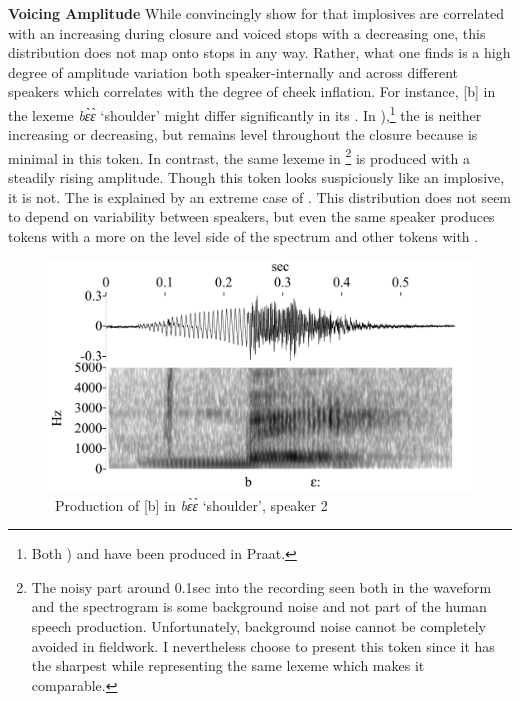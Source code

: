 \documentclass[output=paper]{LSP/langsci}
\begin{document}
{\bf Voicing Amplitude} While \citet{Nagano2012} convincingly show for  that implosives are correlated with an increasing  during closure and voiced stops with a decreasing one, this distribution does not map onto  stops in any way. Rather, what one finds is a high degree of amplitude variation both speaker-internally and across different speakers which correlates with the degree of cheek inflation.  For instance, [b] in the lexeme {\it bɛ̀ɛ̀} `shoulder' might differ significantly in its . In ),\footnote{Both ) and  have been produced in Praat.} the  is neither increasing or decreasing, but remains level throughout the closure because  is minimal in this token. In contrast, the same lexeme in \footnote{The noisy part around 0.1sec into the recording seen both in the waveform and the spectrogram is some background noise and not part of the human speech production. Unfortunately, background noise cannot be completely avoided in fieldwork. I nevertheless choose to present this token since it has the sharpest  while representing the same lexeme which makes it comparable.} is produced with a steadily rising amplitude. Though this token looks suspiciously like an implosive, it is not. The  is explained by an extreme case of .   This distribution does not seem to depend on variability between speakers, but even the same speaker produces tokens with a  more on the level side of the spectrum and other tokens with .

\begin{figure}[h!]
\caption{\  Production of [b] in {\it bɛ̀ɛ̀} `shoulder', speaker 2}
\label{fig:grimm:3}
\begin{center}
\includegraphics[width=\textwidth]{figures/GyeliB-Mama-mini.jpg}
\end{center}
\end{figure}
\end{document}
